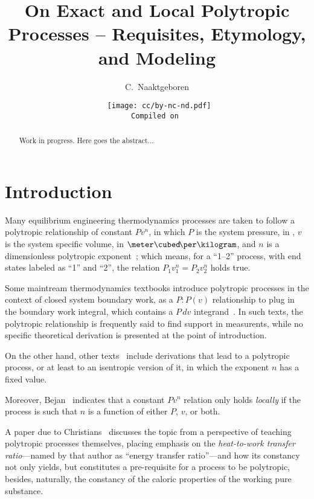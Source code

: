 \documentclass[10pt,a4paper]{article}
\title{On Exact and Local Polytropic Processes -- Requisites, Etymology, and Modeling}
\author[1]{C.~Naaktgeboren}
\affil[1]{%
    Universidade Tecnológica Federal do Paraná -- UTFPR, Câmpus Guarapuava.\par
    Grupo de Pesquisa em Ciências Térmicas.
}
\date{{\scriptsize\tt%
    \texttt{[image: cc/by-nc-nd.pdf]}\\
    Compiled on 
}}
\begin{document}

\maketitle

\begin{abstract}
    Work in progress.
    Here goes the abstract...
\end{abstract}

\section{Introduction}

    Many equilibrium engineering thermodynamics processes  are  taken  to  follow  a  polytropic
    relationship of constant $Pv^n$, in which $P$ is the system pressure, in  \kilo\pascal,  $v$
    is the system specific volume, in $\meter\cubed\!\per\kilogram$, and $n$ is a  dimensionless
    polytropic exponent~\cite{2013-CengelYA+BolesMA-AMGH}; which means, for a ``1--2''  process,
    with end states labeled as ``1'' and ``2'', the relation $P_1v_1^n = P_2v_2^n$ holds true.

    Some maintream thermodynamics textbooks introduce polytropic processes  in  the  context  of
    closed system boundary work, as a  $P:P(v)$  relationship  to  plug  in  the  boundary  work
    integral,   which    contains    a    $P\,dv$    integrand~\cite{2013-CengelYA+BolesMA-AMGH,
    2002-MoranMJ+ShapiroHN-LTC, 1985-WylenG-Wiley}. In such texts, the  polytropic  relationship
    is frequently said to find support in measurents, while no specific  theoretical  derivation
    is presented at the point of introduction.

    On  the  other  hand,  other  texts~\cite{1986-JonesJB+HawkinsGA-Wiley,   2006-BejanA-Wiley,
    2015-KroosKA+PotterMC-Cengage} include derivations that lead to a polytropic process, or  at
    least to an isentropic version of it, in which the exponent $n$ has a fixed value.

    Moreover, Bejan~\cite[p.~175]{2006-BejanA-Wiley} indicates that a constant  $Pv^n$  relation
    only holds \emph{locally} if the process is such that $n$ is a function of either $P$,  $v$,
    or both.

    A paper due to Christians~\cite{2012-ChristiansJ-IntJMechEngEduc} discusses the topic from a
    perspective  of  teaching  polytropic  processes  themselves,  placing   emphasis   on   the
    \emph{heat-to-work transfer ratio}---named by that author as ``energy transfer ratio''---and
    how its constancy not only yields, but constitutes a  pre-requisite  for  a  process  to  be
    polytropic, besides, naturally, the constancy of the caloric properties of the working  pure
    substance.
\end{document}
